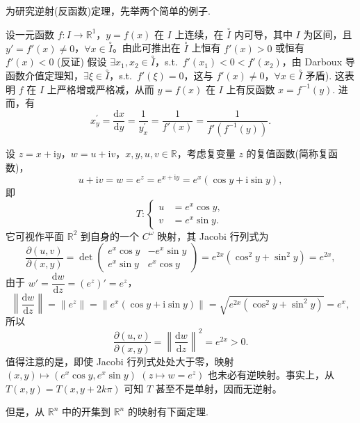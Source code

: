 为研究逆射(反函数)定理，先举两个简单的例子.

\begin{example}\label{ex:8.4.1}
设一元函数 $f: I \to \mathbb{R}^{1}$，$y = f(x)$ 在 $I$ 上连续，在 $\overset{\circ}{I}$ 内可导，其中 $I$ 为区间，且 $y' = f'(x) \neq 0$，$\forall x \in \overset{\circ}{I}$。由此可推出在 $\overset{\circ}{I}$ 上恒有 $f'(x) > 0$ 或恒有 $f'(x) < 0$ (反证) 假设 $\exists x_{1},x_{2} \in \overset{\circ}{I}$，s.t.\ $f'(x_{1}) < 0 < f'(x_{2})$，由 Darboux 导函数介值定理知，$\exists \xi \in \overset{\circ}{I}$，s.t.\ $f'(\xi) = 0$，这与 $f'(x) \neq 0$，$\forall x \in \overset{\circ}{I}$ 矛盾). 这表明 $f$ 在 $I$ 上严格增或严格减，从而 $y = f(x)$ 在 $I$ 上有反函数 $x = f^{-1}(y)$. 进而，有
\[
  x_{y}^{\prime} = \frac{\mathrm{d}x}{\mathrm{d}y} = \frac{1}{y_{x}^{\prime}} = \frac{1}{f'(x)} = \frac{1}{f'(f^{-1}(y))}.
\]
\end{example}

\begin{example}\label{ex:8.4.2}
设 $z = x + \mathrm{i}y$，$w = u + \mathrm{i}v$，$x,y,u,v \in \mathbb{R}$，考虑复变量 $z$ 的复值函数(简称复函数)，
\[
  u + \mathrm{i}v = w = e^{z} = e^{x + \mathrm{i}y} = e^{x}(\cos y + \mathrm{i}\sin y),
\]
即
\[
  T\colon \left\{\begin{aligned}
    u &= e^{x}\cos y, \\
    v &= e^{x}\sin y.
  \end{aligned}\right.
\]
它可视作平面 $\mathbb{R}^{2}$ 到自身的一个 $C^{\omega}$ 映射，其 Jacobi 行列式为
\[
  \frac{\partial(u,v)}{\partial(x,y)} = \det\begin{pmatrix} e^{x}\cos y & -e^{x}\sin y \\ e^{x}\sin y & e^{x}\cos y \end{pmatrix} = e^{2x}(\cos^{2}y + \sin^{2}y) = e^{2x},
\]
由于 $w' = \dfrac{\mathrm{d}w}{\mathrm{d}z} = (e^{z})' = e^{z}$，
\[
  \left\|\frac{\mathrm{d}w}{\mathrm{d}z}\right\| = \|e^{z}\| = \|e^{x}(\cos y + \mathrm{i}\sin y)\| = \sqrt{e^{2x}(\cos^{2}y + \sin^{2}y)} = e^{x},
\]
所以
\[
  \frac{\partial(u,v)}{\partial(x,y)} = \left\|\frac{\mathrm{d}w}{\mathrm{d}z}\right\|^{2} = e^{2x} > 0.
\]
值得注意的是，即使 Jacobi 行列式处处大于零，映射 $(x,y) \mapsto (e^{x}\cos y,e^{x}\sin y)$ $(z \mapsto w = e^{z})$ 也未必有逆映射。事实上，从 $T(x,y) = T(x,y + 2k\pi)$ 可知 $T$ 甚至不是单射，因而无逆射。

但是，从 $\mathbb{R}^{n}$ 中的开集到 $\mathbb{R}^{n}$ 的映射有下面定理.
\end{example}

